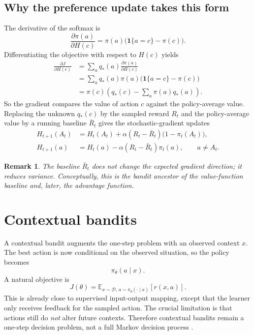 \documentclass[11pt]{article}
\newtheorem{remark}{Remark}
\newcommand{\E}{\mathbb{E}}
\newcommand{\1}{\mathbf{1}}
\begin{document}
\subsection{Why the preference update takes this form}

The derivative of the softmax is
\begin{equation}
\frac{\partial \pi(a)}{\partial H(c)} = \pi(a)\bigl(\1\{a=c\}-\pi(c)\bigr).
\end{equation}
Differentiating the objective with respect to $H(c)$ yields
\begin{align}
\frac{\partial J}{\partial H(c)}
&= \sum_a q_*(a)\frac{\partial \pi(a)}{\partial H(c)} \\
&= \sum_a q_*(a)\pi(a)\bigl(\1\{a=c\}-\pi(c)\bigr) \\
&= \pi(c)\left(q_*(c)-\sum_a \pi(a)q_*(a)\right).
\end{align}
So the gradient compares the value of action $c$ against the policy-average value. Replacing the unknown $q_*(c)$ by the sampled reward $R_t$ and the policy-average value by a running baseline $\bar R_t$ gives the stochastic-gradient updates
\begin{align}
H_{t+1}(A_t) &= H_t(A_t)+\alpha(R_t-\bar R_t)\bigl(1-\pi_t(A_t)\bigr), \\
H_{t+1}(a) &= H_t(a)-\alpha(R_t-\bar R_t)\pi_t(a), \qquad a\neq A_t.
\end{align}

\begin{remark}
The baseline $\bar R_t$ does not change the expected gradient direction; it reduces variance. Conceptually, this is the bandit ancestor of the value-function baseline and, later, the advantage function.
\end{remark}

\section{Contextual bandits}

A contextual bandit augments the one-step problem with an observed context $x$. The best action is now conditional on the observed situation, so the policy becomes
\begin{equation}
\pi_\theta(a\mid x).
\end{equation}
A natural objective is
\begin{equation}
J(\theta)=\E_{x\sim \mathcal D,\, a\sim \pi_\theta(\cdot\mid x)}[r(x,a)].
\end{equation}
This is already close to supervised input-output mapping, except that the learner only receives feedback for the sampled action. The crucial limitation is that actions still do \emph{not} alter future contexts. Therefore contextual bandits remain a one-step decision problem, not a full Markov decision process \cite{SuttonBarto2018}.
\end{document}
